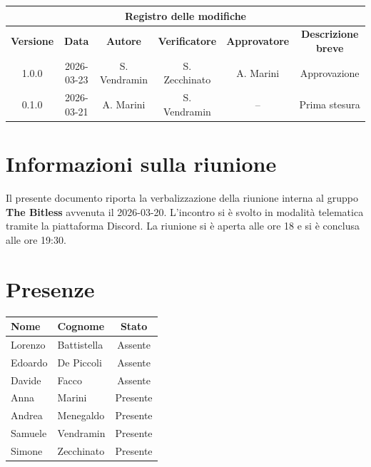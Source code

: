 \documentclass[a4paper, 10pt, colorlinks=true, linkcolor=black, urlcolor=blue, citecolor=blue, hidelinks]{article}
\begin{document}
\newcommand{\tipoverbale}{interno}
\newcommand{\dataverbale}{2026-03-20}
\newcommand{\dataversione}{2026-03-23}
\newcommand{\versione}{1.0.0}
\newcommand{\stato}{Approvato}
\newcommand{\destinatari}{The Bitless, prof. Tullio Vardanega, prof. Riccardo Cardin}

\begin{titlepage}

\end{titlepage}

\newpage
{}

\begin{center}
    \begin{tabular}{|c|c|c|c|c|c|}
        \hline
        \multicolumn{6}{|c|}{\textbf{Registro delle modifiche}} \\
        \hline
        \textbf{Versione} & \textbf{Data} & \textbf{Autore} & \textbf{Verificatore} & \textbf{Approvatore} & \textbf{Descrizione breve} \\
        \hline
        1.0.0 & 2026-03-23 & S. Vendramin & S. Zecchinato & A. Marini & Approvazione \\
        \hline
        0.1.0 & 2026-03-21 & A. Marini & S. Vendramin & -- & Prima stesura \\
        \hline
    \end{tabular}
\end{center}


\newpage
\tableofcontents 

\newpage
\section{Informazioni sulla riunione}
Il presente documento riporta la verbalizzazione della riunione interna al gruppo \textbf{The Bitless} avvenuta il \dataverbale{}. L'incontro si è svolto in modalità telematica tramite la piattaforma Discord. La riunione si è aperta alle ore 18 e si è conclusa alle ore 19:30.

\section{Presenze}
\begin{center}
\begin{tabular}{|l|l|c|}
\hline
\textbf{Nome} & \textbf{Cognome} & \textbf{Stato} \\
\hline
Lorenzo & Battistella & Assente \\
Edoardo & De Piccoli & Assente \\
Davide & Facco & Assente \\
Anna & Marini & Presente \\
Andrea & Menegaldo & Presente \\
Samuele & Vendramin & Presente \\
Simone & Zecchinato & Presente \\
\hline
\end{tabular}
\end{center}
\end{document}
